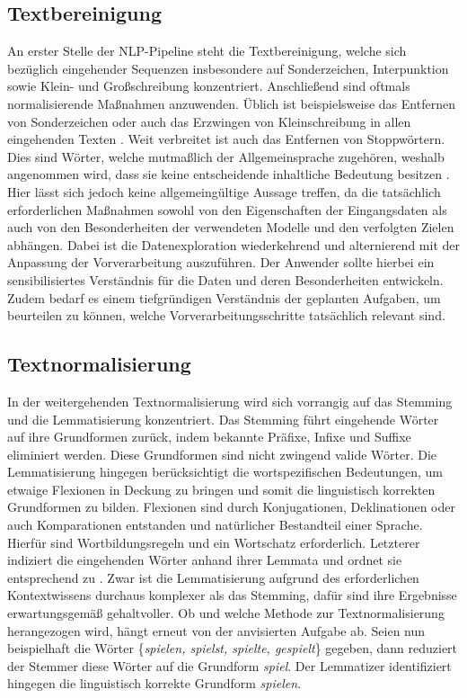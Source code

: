 \subsection{Textbereinigung}
\noindent
An erster Stelle der \ac{NLP}-Pipeline steht die Textbereinigung, welche sich bezüglich eingehender Sequenzen insbesondere auf Sonderzeichen, Interpunktion sowie Klein- und Großschreibung konzentriert. Anschließend sind oftmals normalisierende Maßnahmen anzuwenden. Üblich ist beispielsweise das Entfernen von Sonderzeichen oder auch das Erzwingen von Kleinschreibung in allen eingehenden Texten \cite[S.~107]{BIR09}. Weit verbreitet ist auch das Entfernen von Stoppwörtern. Dies sind Wörter, welche mutmaßlich der Allgemeinsprache zugehören, weshalb angenommen wird, dass sie keine entscheidende inhaltliche Bedeutung besitzen \cite[S.~5]{GAM16}. Hier lässt sich jedoch keine allgemeingültige Aussage treffen, da die tatsächlich erforderlichen Maßnahmen sowohl von den Eigenschaften der Eingangsdaten als auch von den Besonderheiten der verwendeten Modelle und den verfolgten Zielen abhängen. Dabei ist die Datenexploration wiederkehrend und alternierend mit der Anpassung der Vorverarbeitung auszuführen. Der Anwender sollte hierbei ein sensibilisiertes Verständnis für die Daten und deren Besonderheiten entwickeln. Zudem bedarf es einem tiefgründigen Verständnis der geplanten Aufgaben, um beurteilen zu können, welche Vorverarbeitungsschritte tatsächlich relevant sind.


\subsection{Textnormalisierung}
\noindent
In der weitergehenden Textnormalisierung wird sich vorrangig auf das Stemming und die Lemmatisierung konzentriert. Das Stemming führt eingehende Wörter auf ihre Grundformen zurück, indem bekannte Präfixe, Infixe und Suffixe eliminiert werden. Diese Grundformen sind nicht zwingend valide Wörter. Die Lemmatisierung hingegen berücksichtigt die wortspezifischen Bedeutungen, um etwaige Flexionen in Deckung zu bringen und somit die linguistisch korrekten Grundformen zu bilden. Flexionen sind durch Konjugationen, Deklinationen oder auch Komparationen entstanden und natürlicher Bestandteil einer Sprache. Hierfür sind Wortbildungsregeln und ein Wortschatz erforderlich. Letzterer indiziert die eingehenden Wörter anhand ihrer Lemmata und ordnet sie entsprechend zu \cite[S.~107-108]{BIR09}. Zwar ist die Lemmatisierung aufgrund des erforderlichen Kontextwissens durchaus komplexer als das Stemming, dafür sind ihre Ergebnisse erwartungsgemäß gehaltvoller. Ob und welche Methode zur Textnormalisierung herangezogen wird, hängt erneut von der anvisierten Aufgabe ab. Seien nun beispielhaft die Wörter \{\textit{spielen, spielst, spielte, gespielt}\} gegeben, dann reduziert der Stemmer diese Wörter auf die Grundform \textit{spiel}. Der Lemmatizer identifiziert hingegen die linguistisch korrekte Grundform \textit{spielen}.\\

